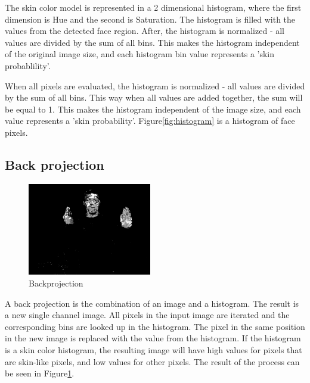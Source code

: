 The skin color model is represented in a 2 dimensional histogram, where the first dimension is Hue and the second is Saturation. The histogram is filled with the values from the detected face region. After, the histogram is normalized - all values are divided by the sum of all bins. This makes the histogram independent of the original image size, and each histogram bin value represents a 'skin probablility'.

When all pixels are evaluated, the histogram is normalized - all values are divided by the sum of all bins. This way when all values are added together, the sum will be equal to 1. This makes the histogram independent of the image size, and each value represents a 'skin probability'. Figure\ref{fig:histogram} is a histogram of face pixels.

\subsection*{Back projection}

\begin{figure}
  \vspace{-20pt}
  \begin{center}
    \includegraphics[width=0.48\textwidth]{figures/pipeline/backproject.jpg}
 \end{center}
  \vspace{-20pt}
	\caption{Backprojection}
	\label{fig:backproject}
  \vspace{-10pt}
\end{figure}


A back projection is the combination of an image and a histogram. The result is a new single channel image. All pixels in the input image are iterated and the corresponding bins are looked up in the histogram. The pixel in the same position in the new image is replaced with the value from the histogram. If the histogram is a skin color histogram, the resulting image will have high values for pixels that are skin-like pixels, and low values for other pixels. The result of the process can be seen in Figure\ref{fig:backproject}.


